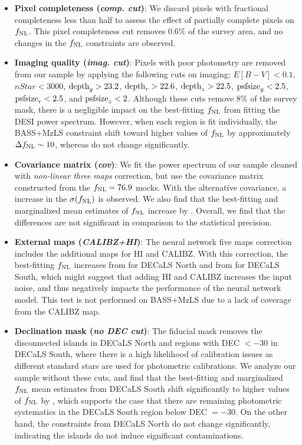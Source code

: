 \begin{itemize}[itemindent=*]
\item \textbf{Pixel completeness (\textit{comp. cut})}: We discard pixels with fractional completeness less than half to assess the effect of partially complete pixels on $f_{\rm NL}$. This pixel completeness cut removes $0.6\%$ of the survey area, and no changes in the $f_{\rm NL}$ constraints are observed.

\item \textbf{Imaging quality (\textit{imag. cut})}: Pixels with poor photometry are removed from our sample by applying the following cuts on imaging; $E[B-V]<0.1$, $nStar < 3000$, ${\rm depth}_{g} > 23.2$, ${\rm depth}_{r} > 22.6$, ${\rm depth}_{z} > 22.5$, ${\rm psfsize}_{g}<2.5$, ${\rm psfsize}_{r}<2.5$, and ${\rm psfsize}_{z}<2$. Although these cuts remove $8\%$ of the survey mask, there is a negligible impact on the best-fitting $f_{\rm NL}$ from fitting the DESI power spectrum. However, when each region  is fit individually, the BASS+MzLS constraint shift toward higher values of $f_{\rm NL}$ by approximately $\Delta f_{\rm NL} \sim 10$,  whereas    do not change significantly. 

\item \textbf{Covariance matrix (\textit{cov})}: We fit the power spectrum of our sample cleaned with \textit{non-linear three maps} correction, but use the covariance matrix constructed from the $f_{\rm NL}=76.9$ mocks. With the alternative covariance, a  increase in the $\sigma(f_{\rm NL})$ is observed. We also find that the best-fitting and marginalized mean estimates of $f_{\rm NL}$ increase by . Overall, we find that the differences are not significant in comparison to the statistical precision.

\item \textbf{External maps (\textit{CALIBZ+HI})}: The neural network five maps correction includes the additional maps for HI and CALIBZ. With this correction, the best-fitting $f_{\rm NL}$ increases from  for DECaLS North and from  for DECaLS South, which might suggest that adding HI and CALIBZ increases the input noise, and thus negatively impacts the performance of the neural network model. This test is not performed on BASS+MzLS due to a lack of coverage from the CALIBZ map. 

\item \textbf{Declination mask (\textit{no DEC cut})}: The fiducial mask removes the disconnected islands in DECaLS North and regions with DEC $<-30$ in DECaLS South, where there is a high likelihood of calibration issues as different standard stars are used for photometric calibrations. We analyze our sample without these cuts, and find that the best-fitting and marginalized $f_{\rm NL}$ mean estimates from DECaLS South shift significantly to higher values of $f_{\rm NL}$ by , which supports the case that there are remaining photometric systematics in the DECaLS South region below DEC $=-30$. On the other hand, the constraints from DECaLS North do not change significantly, indicating the islands do not induce significant contaminations.


\end{itemize}
